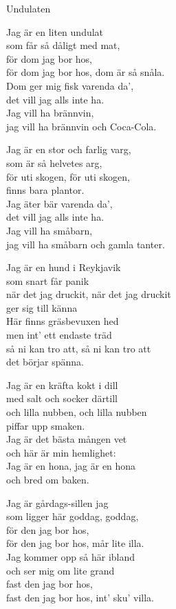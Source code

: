 \begin{song}{Undulaten}

    

    \showversenumber	
	Jag är en liten undulat\\
	som får så dåligt med mat,\\
	för dom jag bor hos,\\
	för dom jag bor hos, dom är så snåla.\\
	Dom ger mig fisk varenda da',\\
	det vill jag alls inte ha.\\
	Jag vill ha brännvin,\\
	jag vill ha brännvin och Coca-Cola.
	
    \showversenumber
	Jag är en stor och farlig varg,\\
	som är så helvetes arg,\\
	för uti skogen, för uti skogen,\\
	finns bara plantor.\\
	Jag äter bär varenda da',\\
	det vill jag alls inte ha.\\
	Jag vill ha småbarn,\\
	jag vill ha småbarn och gamla tanter.
	
    \showversenumber
	Jag är en hund i Reykjavik\\
	som snart får panik\\
	när det jag druckit, när det jag druckit\\
	ger sig till känna\\
	Här finns gräsbevuxen hed\\
	men int' ett endaste träd\\
	så ni kan tro att, så ni kan tro att\\
	det börjar spänna.
	
    \showversenumber
	Jag är en kräfta kokt i dill\\
	med salt och socker därtill\\
	och lilla nubben, och lilla nubben\\
	piffar upp smaken.\\
	Jag är det bästa mången vet\\
	och här är min hemlighet:\\
	Jag är en hona, jag är en hona\\
	och bred om baken.
	
    \showversenumber
	Jag är gårdags-sillen jag\\
	som ligger här goddag, goddag,\\
	för den jag bor hos,\\
	för den jag bor hos, mår lite illa.\\
	Jag kommer opp så här ibland\\
	och ser mig om lite grand\\
	fast den jag bor hos,\\
	fast den jag bor hos, int' sku' villa.
	
\end{song}
